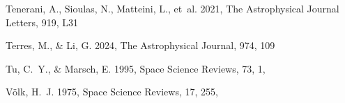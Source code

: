 \documentclass[twocolumn, times]{aastex631}
\begin{document}
\begin{thebibliography}{}
Tenerani, A., Sioulas, N., Matteini, L., {et~al.} 2021, The Astrophysical Journal Letters, 919, L31

Terres, M., \& Li, G. 2024, The Astrophysical Journal, 974, 109

Tu, C.~Y., \& Marsch, E. 1995, Space Science Reviews, 73, 1, 

Völk, H.~J. 1975, Space Science Reviews, 17, 255, 

\end{thebibliography}
\end{document}
